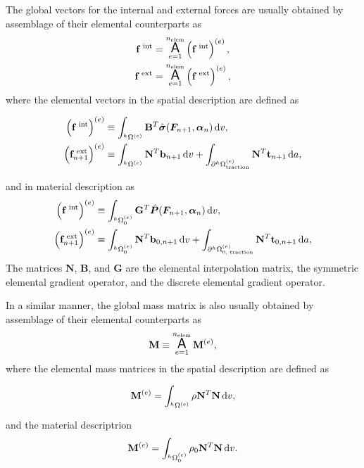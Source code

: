 The global vectors for the internal and external forces are usually obtained by assemblage of their elemental counterparts as
\begin{gather}
    \mathbf f^\text{\;int} = \operatorname*{\text{\Large $ \mathsf{A} $}}_{e=1}^{n_\text{elem}} \left(\mathbf f^\text{\;int}\right)^{(e)},\\
    \mathbf f^\text{\;ext} = \operatorname*{\text{\Large $ \mathsf{A} $}}_{e=1}^{n_\text{elem}} \left(\mathbf f^\text{\;ext}\right)^{(e)},
\end{gather}
where the elemental vectors in the spatial description are defined as
\begin{highlight}[innertopmargin=-5pt]
    \begin{align}
        \left(\mathbf f^\text{\;int}\right)^{(e)} &\equiv \int_{^h\Omega^{(e)}} \mathbf B^T \hat{\bm{\sigma} }(\bm{F}_{n+1},\bm{\alpha}_n)\,\mathrm{d} v,\\
        \left(\mathbf f^\text{\;ext}_{n+1}\right)^{(e)} &\equiv \int_{^h\Omega^{(e)}}\mathbf N^T \mathbf b_{n+1}\,\mathrm{d} v + \int_{\partial^h\Omega_\text{traction}^{(e)}} \mathbf N^T \mathbf t_{n+1}\,\mathrm{d} a,
    \end{align}
\end{highlight}
and in material description as
    \begin{align}
        \left(\mathbf f^\text{\;int}\right)^{(e)} &\equiv \int_{^h\Omega_0^{(e)}} \mathbf G^T \hat{\bm{P} }(\bm{F}_{n+1},\bm{\alpha}_n)\,\mathrm{d} v,\\
        \left(\mathbf f^\text{\;ext}_{n+1}\right)^{(e)} &\equiv \int_{^h\Omega_0^{(e)}}\mathbf N^T \mathbf b_{0,n+1}\,\mathrm{d} v + \int_{\partial^h\Omega_\text{0, traction}^{(e)}} \mathbf N^T \mathbf t_{0,n+1}\,\mathrm{d} a,
    \end{align}
The matrices $\mathbf N$, $\mathbf B$, and $\mathbf G$ are the elemental interpolation matrix, the symmetric elemental gradient operator, and the discrete elemental gradient operator.

In a similar manner, the global mass matrix is also usually obtained by assemblage of their elemental counterparts as
\begin{equation}
  \mathbf M \equiv \operatorname*{\text{\Large $ \mathsf{A} $}}_{e=1}^{n_\text{elem}} \mathbf M^{(e)},
\end{equation}
where the elemental mass matrices in the spatial description are defined as
\begin{highlight}
  \begin{equation}
    \mathbf M^{(e)} = \int_{^h\Omega^{(e)}} \rho \mathbf N^T\mathbf N\,\mathrm{d} v,
  \end{equation}
\end{highlight}
and the material descriptrion
\begin{equation}
  \mathbf M^{(e)} = \int_{^h\Omega_0^{(e)}} \rho_0\mathbf N^T\mathbf N \,\mathrm{d} v.
\end{equation}

